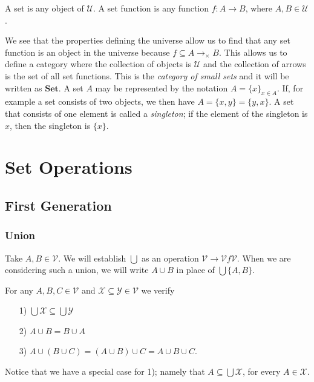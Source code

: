 \documentclass [12pt]{book}
\begin{document}
\begin{definition}A set is any object of $\mathcal{U}$. A set function is any function $f:A\rightarrow B$, where $A,B\in\mathcal{U}$.\end{definition}

We see that the properties defining the universe allow us to find that any set function is an object in the universe because $f\subseteq A\rightarrow_{\times}B$. This allows us to define a category where the collection of objects is $\mathcal{U}$ and the collection of arrows is the set of all set functions. This is the \textit{category of small sets} and it will be written as $\textbf{Set}$. A set $A$ may be represented by the notation $A=\{x\}_{x\in A}$. If, for example a set consists of two objects, we then have $A=\{x,y\}=\{y,x\}$. A set that consists of one element is called a \textit{singleton}; if the element of the singleton is $x$, then the singleton is $\{x\}$.

	\section{Set Operations}

		\subsection{First Generation}

\subsubsection{Union} Take $A,B\in\mathcal{V}$. We will establish $\bigcup$ as an operation $\mathcal{V}\rightarrow\mathcal{V}f\mathcal{V}$. When we are considering such a union, we will write $A\cup B$ in place of $\bigcup\{A,B\}$.

\begin{proposition}For any $A,B,C\in\mathcal{V}$ and $\mathcal{X}\subseteq\mathcal{Y}\in\mathcal{V}$ we verify\begin{itemize}\item[1)]$\bigcup\mathcal{X}\subseteq\bigcup\mathcal{Y}$\item[2)]$A\cup B=B\cup A$
\item[3)]$A\cup(B\cup C)=(A\cup B)\cup C=A\cup B\cup C$.
\end{itemize}\end{proposition}

Notice that we have a special case for 1); namely that $A\subseteq\bigcup\mathcal{X}$, for every $A\in\mathcal{X}$.
\end{document}
